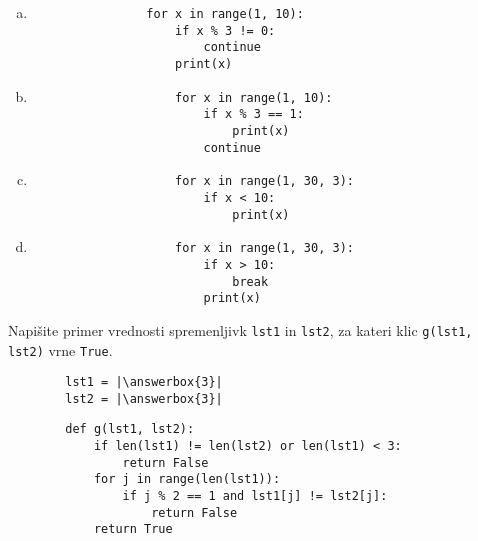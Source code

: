 \documentclass[arhiv, 10pt]{../izpit}
\newcommand{\inlinepy}[1]{\texttt{#1}}
\newcommand{\answerbox}[1]{\framebox{\vphantom{\large M}\hspace{#1cm}}}
\begin{document}
        \begin{multicols}{2}
        \begin{enumerate}[(a)]
\item 
            \begin{verbatim}
                for x in range(1, 10):
                    if x % 3 != 0:
                        continue
                    print(x)
            \end{verbatim}
        
\item 
                \begin{verbatim}
                    for x in range(1, 10):
                        if x % 3 == 1:
                            print(x)
                        continue
                \end{verbatim}
            
\item 
                \begin{verbatim}
                    for x in range(1, 30, 3):
                        if x < 10:
                            print(x)
                \end{verbatim}
            
\item 
                \begin{verbatim}
                    for x in range(1, 30, 3):
                        if x > 10:
                            break
                        print(x)
                \end{verbatim}
            
\end{enumerate}

        \end{multicols}
    
        \naloga*
        \begin{multicols}{2}
        \noindent
        Napišite primer vrednosti spremenljivk \inlinepy{lst1} in \inlinepy{lst2}, za kateri klic \inlinepy{g(lst1, lst2)} vrne \inlinepy{True}.
        \begin{verbatim}
        lst1 = |\answerbox{3}|
        lst2 = |\answerbox{3}|
        \end{verbatim}
        \vfil
        \columnbreak
        \begin{verbatim}
        def g(lst1, lst2):
            if len(lst1) != len(lst2) or len(lst1) < 3:
                return False
            for j in range(len(lst1)):
                if j % 2 == 1 and lst1[j] != lst2[j]:
                    return False
            return True
        \end{verbatim}
        \end{multicols}
    
\end{document}
